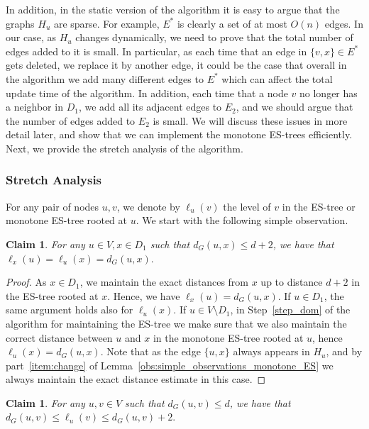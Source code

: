 \documentclass[11pt]{article}
\newtheorem{claim}[theorem]{Claim}
\theoremstyle{definition}
\theoremstyle{remark}
\newcommand{\ytodo}[1]{\todo[color=blue!20]{Y: #1}}
\newcommand{\mtodo}[1]{\todo[color=red!20]{M: #1}}
\begin{document}
\begin{titlepage}
In addition, in the static version of the algorithm it is easy to argue that the graphs $H_u$ are sparse. For example, $E^*$ is clearly a set of at most $O(n)$ edges. In our case, as $H_u$ changes dynamically, we need to prove that the total number of edges added to it is small.
In particular, as each time that an edge in $\{v,x\} \in E^*$ gets deleted, we replace it by another edge, it could be the case that overall in the algorithm we add many different edges to $E^*$ which can affect the total update time of the algorithm. In addition, each time that a node $v$ no longer has a neighbor in $D_1$, we add all its adjacent edges to $E_2$, and we should argue that the number of edges added to $E_2$ is small.
We will discuss these issues in more detail later, and show that we can implement the monotone ES-trees efficiently. 
Next, we provide the stretch analysis of the algorithm.

\subsubsection{Stretch Analysis} \label{sec:add_warmup_stretch} %
For any pair of nodes $u,v$, we denote by $\ell_u(v)$ the level of $v$ in the ES-tree or monotone ES-tree rooted at $u$. We start with the following simple observation. 
\begin{claim}\label{obs:stretch_warmup}
For any $u \in V, x \in D_1$ such that $d_G(u,x) \leq d+2$, we have that $\ell_x(u)=\ell_u(x)=d_G(u,x).$
\end{claim} 

\begin{proof}
As $x \in D_1$, we maintain the exact distances from $x$ up to distance $d+2$ in the ES-tree rooted at $x$. Hence, we have $\ell_x(u)=d_G(u,x)$. If $u \in D_1$, the same argument holds also for $\ell_u(x)$. If $u \in V \setminus D_1$, in Step~\ref{step_dom} of the algorithm for maintaining the ES-tree we make sure that we also maintain the correct distance between $u$ and $x$ in the monotone ES-tree rooted at $u$, hence $\ell_u(x)=d_G(u,x)$. Note that as the edge $\{u,x\}$ always appears in $H_u$, and by part~\ref{item:change} of Lemma~\ref{obs:simple_observations_monotone_ES} we always maintain the exact distance estimate in this case.
\end{proof}


\begin{claim}\label{claim:stretch_warmup}
For any $u,v \in V$ such that $d_G(u,v) \leq d$, we have that $d_G(u,v) \leq \ell_u(v) \leq d_G(u,v) +2.$
\end{claim}


\end{titlepage}
\end{document}
